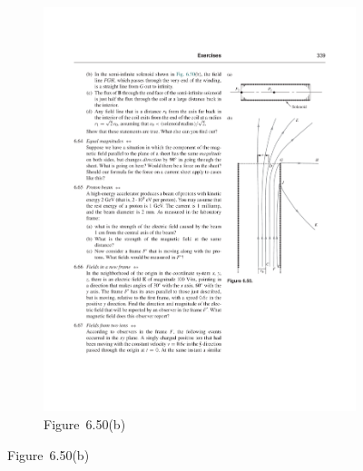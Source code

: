 \documentclass{article}
\begin{document}
\begin{homeworkProblem}
\begin{figure}[H]
\begin{subfigure}[b]{0.3\textwidth}
			\includegraphics[width=\textwidth]{6_50b.pdf}
			\caption*{Figure~6.50(b)}
		\end{subfigure}
	\end{figure}


\end{homeworkProblem}
\end{document}
